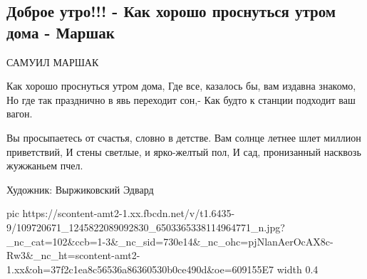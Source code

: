  
 
 
 
 

\subsection{Доброе утро!!! - Как хорошо проснуться утром дома - Маршак}

САМУИЛ МАРШАК 

Как хорошо проснуться утром дома, 
Где все, казалось бы, вам издавна знакомо, 
Но где так празднично в явь переходит сон,- 
Как будто к станции подходит ваш вагон. 

Вы просыпаетесь от счастья, словно в детстве. 
Вам солнце летнее шлет миллион приветствий, 
И стены светлые, и ярко-желтый пол, 
И сад, пронизанный насквозь жужжаньем пчел. 

Художник: Выржиковский Эдвард

\ifcmt
  pic https://scontent-amt2-1.xx.fbcdn.net/v/t1.6435-9/109720671_1245822089092830_6503365338114964771_n.jpg?_nc_cat=102&ccb=1-3&_nc_sid=730e14&_nc_ohc=pjNlanAerOcAX8c-Rw3&_nc_ht=scontent-amt2-1.xx&oh=37f2c1ea8c56536a86360530b0ce490d&oe=609155E7
  width 0.4
\fi

